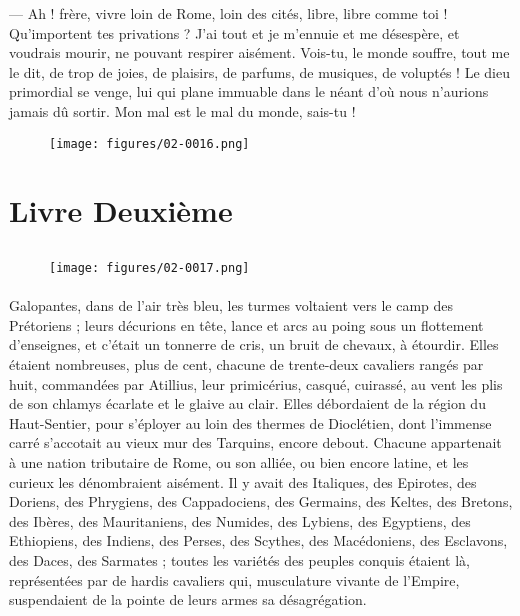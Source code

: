 \documentclass[a4paper, 11pt, oneside, polutonikogreek, french]{article}
\begin{document}
--- Ah ! frère, vivre loin de Rome, loin des cités, libre, libre comme toi ! Qu'importent tes privations ? J'ai tout et je m'ennuie et me désespère, et voudrais mourir, ne pouvant respirer aisément. Vois-tu, le monde souffre, tout me le dit, de trop de joies, de plaisirs, de parfums, de musiques, de voluptés ! Le dieu primordial se venge, lui qui plane immuable dans le néant d'où nous n'aurions jamais dû sortir. Mon mal est le mal du monde, sais-tu !
\begin{figure}[H]
\centering
\texttt{[image: figures/02-0016.png]}
\end{figure}
\clearpage
\section{Livre Deuxième}
\subsection{}
\begin{figure}[H]
\centering
\texttt{[image: figures/02-0017.png]}
\end{figure}
\paragraph{}
Galopantes, dans de l'air très bleu, les turmes voltaient vers le camp des Prétoriens ; leurs décurions en tête, lance et arcs au poing sous un flottement d'enseignes, et c'était un tonnerre de cris, un bruit de chevaux, à étourdir. Elles étaient nombreuses, plus de cent, chacune de trente-deux cavaliers rangés par huit, commandées par Atillius, leur primicérius, casqué, cuirassé, au vent les plis de son chlamys écarlate et le glaive au clair. Elles débordaient de la région du Haut-Sentier, pour s'éployer au loin des thermes de Dioclétien, dont l'immense carré s'accotait au vieux mur des Tarquins, encore debout. Chacune appartenait à une nation tributaire de Rome, ou son alliée, ou bien encore latine, et les curieux les dénombraient aisément. Il y avait des Italiques, des Epirotes, des Doriens, des Phrygiens, des Cappadociens, des Germains, des Keltes, des Bretons, des Ibères, des Mauritaniens, des Numides, des Lybiens, des Egyptiens, des Ethiopiens, des Indiens, des Perses, des Scythes, des Macédoniens, des Esclavons, des Daces, des Sarmates ; toutes les variétés des peuples conquis étaient là, représentées par de hardis cavaliers qui, musculature vivante de l'Empire, suspendaient de la pointe de leurs armes sa désagrégation.
\end{document}
